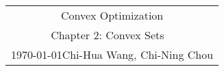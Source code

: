 \documentclass[11pt]{article}
\newcommand{\scribe}{Chi-Hua Wang, Chi-Ning Chou}
\newcommand{\lecnum}{2}
\newcommand{\lecname}{Convex Sets}
\newcommand{\lecdate}{\today}
\begin{document}
	
\begin{center}
	\renewcommand{\arraystretch}{2}
	\begin{bfseries}
		\begin{tabular}{c}
			\vspace{0.5cm}
			\Huge Convex Optimization\\
			\vspace{0.5cm}
			\hspace{10em} {\Large Chapter \lecnum: \lecname} \hspace{10em}\ \\
			\lecdate \hfill \scribe\\
			\hline
		\end{tabular}
		\renewcommand{\arraystretch}{1}
	\end{bfseries}
\end{center}
	


\newpage


\end{document}
